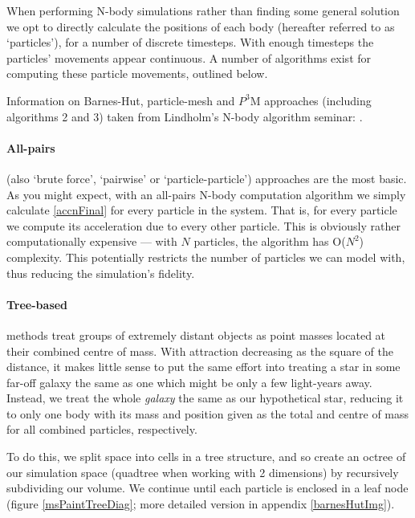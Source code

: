 \documentclass[11pt,a4paper]{article}
\begin{document}

When performing N-body simulations rather than finding some general solution we opt to directly calculate the positions of each body (hereafter referred to as `particles'), for a number of discrete timesteps. With enough timesteps the particles' movements appear continuous. A number of algorithms exist for computing these particle movements, outlined below.

Information on Barnes-Hut, particle-mesh and $P^3$M approaches (including algorithms 2 and 3) taken from Lindholm's N-body algorithm seminar: \cite{nbodyAlg}.

\paragraph{All-pairs}\label{allPairs}(also `brute force', `pairwise' or `particle-particle') approaches are the most basic. As you might expect, with an all-pairs N-body computation algorithm we simply calculate \ref{accnFinal} for every particle in the system. That is, for every particle we compute its acceleration due to every other particle. This is obviously rather computationally expensive --- with $N$ particles, the algorithm has O($N^2$) complexity. This potentially restricts the number of particles we can model with, thus reducing the simulation's fidelity. 


\paragraph{Tree-based}\label{barnesHut}methods treat groups of extremely distant objects as point masses located at their combined centre of mass. With attraction decreasing as the square of the distance, it makes little sense to put the same effort into treating a star in some far-off galaxy the same as one which might be only a few light-years away. Instead, we treat the whole \emph{galaxy} the same as our hypothetical star, reducing it to only one body with its mass and position given as the total and centre of mass for all combined particles, respectively. 

To do this, we split space into cells in a tree structure, and so create an octree of our simulation space (quadtree when working with 2 dimensions) by recursively subdividing our volume. We continue until each particle is enclosed in a leaf node (figure \ref{msPaintTreeDiag}; more detailed version in appendix \ref{barnesHutImg}). 
\end{document}
